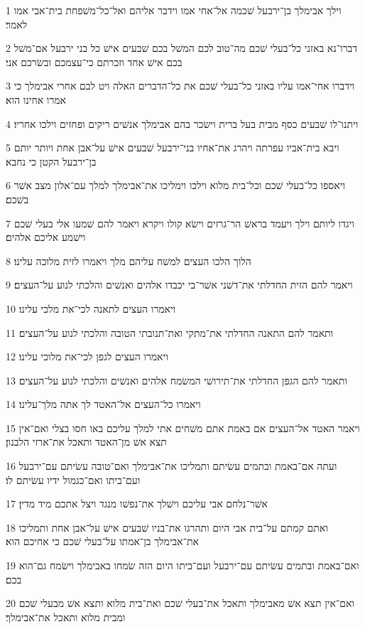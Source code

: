 \par 1 וילך אבימלך בן־ירבעל שׁכמה אל־אחי אמו וידבר אליהם ואל־כל־משׁפחת בית־אבי אמו לאמר׃
\par 2 דברו־נא באזני כל־בעלי שׁכם מה־טוב לכם המשׁל בכם שׁבעים אישׁ כל בני ירבעל אם־משׁל בכם אישׁ אחד וזכרתם כי־עצמכם ובשׂרכם אני׃
\par 3 וידברו אחי־אמו עליו באזני כל־בעלי שׁכם את כל־הדברים האלה ויט לבם אחרי אבימלך כי אמרו אחינו הוא׃
\par 4 ויתנו־לו שׁבעים כסף מבית בעל ברית וישׂכר בהם אבימלך אנשׁים ריקים ופחזים וילכו אחריו׃
\par 5 ויבא בית־אביו עפרתה ויהרג את־אחיו בני־ירבעל שׁבעים אישׁ על־אבן אחת ויותר יותם בן־ירבעל הקטן כי נחבא׃
\par 6 ויאספו כל־בעלי שׁכם וכל־בית מלוא וילכו וימליכו את־אבימלך למלך עם־אלון מצב אשׁר בשׁכם׃
\par 7 ויגדו ליותם וילך ויעמד בראשׁ הר־גרזים וישׂא קולו ויקרא ויאמר להם שׁמעו אלי בעלי שׁכם וישׁמע אליכם אלהים׃
\par 8 הלוך הלכו העצים למשׁח עליהם מלך ויאמרו לזית מלוכה עלינו׃
\par 9 ויאמר להם הזית החדלתי את־דשׁני אשׁר־בי יכבדו אלהים ואנשׁים והלכתי לנוע על־העצים׃
\par 10 ויאמרו העצים לתאנה לכי־את מלכי עלינו׃
\par 11 ותאמר להם התאנה החדלתי את־מתקי ואת־תנובתי הטובה והלכתי לנוע על־העצים׃
\par 12 ויאמרו העצים לגפן לכי־את מלוכי עלינו׃
\par 13 ותאמר להם הגפן החדלתי את־תירושׁי המשׂמח אלהים ואנשׁים והלכתי לנוע על־העצים׃
\par 14 ויאמרו כל־העצים אל־האטד לך אתה מלך־עלינו׃
\par 15 ויאמר האטד אל־העצים אם באמת אתם משׁחים אתי למלך עליכם באו חסו בצלי ואם־אין תצא אשׁ מן־האטד ותאכל את־ארזי הלבנון׃
\par 16 ועתה אם־באמת ובתמים עשׂיתם ותמליכו את־אבימלך ואם־טובה עשׂיתם עם־ירבעל ועם־ביתו ואם־כגמול ידיו עשׂיתם לו׃
\par 17 אשׁר־נלחם אבי עליכם וישׁלך את־נפשׁו מנגד ויצל אתכם מיד מדין׃
\par 18 ואתם קמתם על־בית אבי היום ותהרגו את־בניו שׁבעים אישׁ על־אבן אחת ותמליכו את־אבימלך בן־אמתו על־בעלי שׁכם כי אחיכם הוא׃
\par 19 ואם־באמת ובתמים עשׂיתם עם־ירבעל ועם־ביתו היום הזה שׂמחו באבימלך וישׂמח גם־הוא בכם׃
\par 20 ואם־אין תצא אשׁ מאבימלך ותאכל את־בעלי שׁכם ואת־בית מלוא ותצא אשׁ מבעלי שׁכם ומבית מלוא ותאכל את־אבימלך׃
